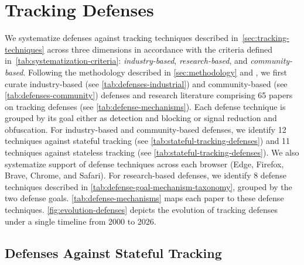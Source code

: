 \section{Tracking Defenses}
\label{sec:tracking-mitigations}

We systematize defenses against tracking techniques described in~\autoref{sec:tracking-techniques} across three dimensions in accordance with the criteria defined in~\autoref{tab:systematization-criteria}: \textit{industry-based}, \textit{research-based}, and \textit{community-based}.
%
Following the methodology described in \autoref{sec:methodology} and , we first curate industry-based (see \autoref{tab:defenses-industrial}) and community-based (see \autoref{tab:defenses-community}) defenses and research literature comprising 65 papers on tracking defenses (see \autoref{tab:defense-mechanisms}).
%
Each defense technique is grouped by its goal either as \colorbox{cellred}{detection and blocking} or \colorbox{cellyellow}{signal reduction and obfuscation}. 
%
For industry-based and community-based defenses, we identify 12 techniques against stateful tracking (see \autoref{tab:stateful-tracking-defenses}) and 11 techniques against stateless tracking (see \autoref{tab:stateful-tracking-defenses}). 
%
We also systematize support of defense techniques across each browser (Edge, Firefox, Brave, Chrome, and Safari). 
%
For research-based defenses, we identify 8 defense techniques described in \autoref{tab:defense-goal-mechanism-taxonomy}, grouped by the two defense goals. 
%
\autoref{tab:defense-mechanisms} maps each paper to these defense techniques.
%
\autoref{fig:evolution-defenses} depicts the evolution of tracking defenses under a single timeline from 2000 to 2026. 


\subsection{Defenses Against Stateful Tracking}
\label{sec:stateful-defenses}


